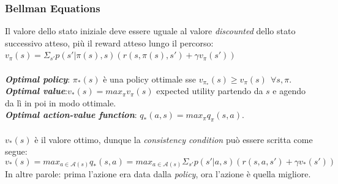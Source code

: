 \documentclass[a4paper, notitlepage, 9pt]{extreport}
\begin{document}
\subsubsection*{Bellman Equations}
Il valore dello stato iniziale deve essere uguale al valore \textit{discounted} dello stato successivo atteso, più il reward atteso lungo il percorso: ~~~$v_\pi(s)=\Sigma_{s'} p(s'|\pi(s),s)(r(s,\pi(s),s')+\gamma v_\pi(s'))$\\\\
\textit{\textbf{Optimal policy}}: $\pi_*(s)$ è una policy ottimale sse $v_{\pi_*}(s) \geq v_\pi(s) ~~\forall s, \pi$.\\
\textit{\textbf{Optimal value}}:$v_*(s) = max_\pi v_\pi (s)$ expected utility partendo da $s$ e agendo da lì in poi in modo ottimale.\\
\textit{\textbf{Optimal action-value function}}: $q_*(a, s) = max_\pi q_\pi(s, a)$.\\\\
$v_*(s)$ è il valore ottimo, dunque la \textit{consistency condition} può essere scritta come segue:
$$v_*(s) = max_{a\in \mathcal{A}(s)} q_*(s, a) = max_{a\in \mathcal{A}(s)} \Sigma_{s'} p(s' | a, s) (r(s, a, s') + \gamma v_*(s')) $$
\noindent
In altre parole: prima l'azione era data dalla \textit{policy}, ora l'azione è quella migliore.

\newpage
\end{document}
